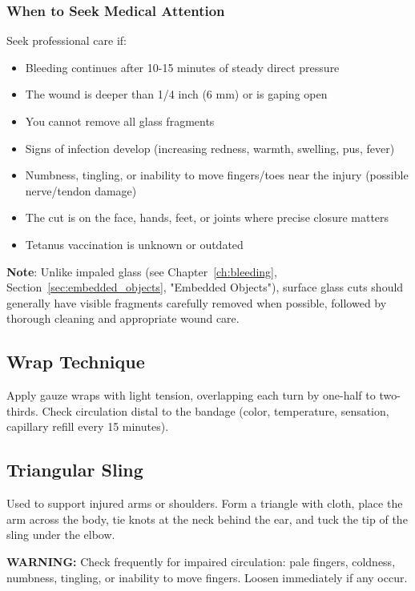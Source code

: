 \subsubsection{When to Seek Medical Attention}

Seek professional care if:
\begin{itemize}[leftmargin=*]
  \item Bleeding continues after 10-15 minutes of steady direct pressure
  \item The wound is deeper than 1/4 inch (6 mm) or is gaping open
  \item You cannot remove all glass fragments
  \item Signs of infection develop (increasing redness, warmth, swelling, pus, fever)
  \item Numbness, tingling, or inability to move fingers/toes near the injury (possible nerve/tendon damage)
  \item The cut is on the face, hands, feet, or joints where precise closure matters
  \item Tetanus vaccination is unknown or outdated
\end{itemize}

\noindent\textbf{Note}: Unlike impaled glass (see Chapter~\ref{ch:bleeding}, Section~\ref{sec:embedded_objects}, "Embedded Objects"), surface glass cuts should generally have visible fragments carefully removed when possible, followed by thorough cleaning and appropriate wound care.


\subsection{Wrap Technique}

Apply gauze wraps with light tension, overlapping each turn by one-half to two-thirds. Check circulation distal to the bandage (color, temperature, sensation, capillary refill every 15 minutes).

\subsection{Triangular Sling}

Used to support injured arms or shoulders. Form a triangle with cloth, place the arm across the body, tie knots at the neck behind the ear, and tuck the tip of the sling under the elbow.

\textbf{WARNING:} Check frequently for impaired circulation: pale fingers, coldness, numbness, tingling, or inability to move fingers. Loosen immediately if any occur.

